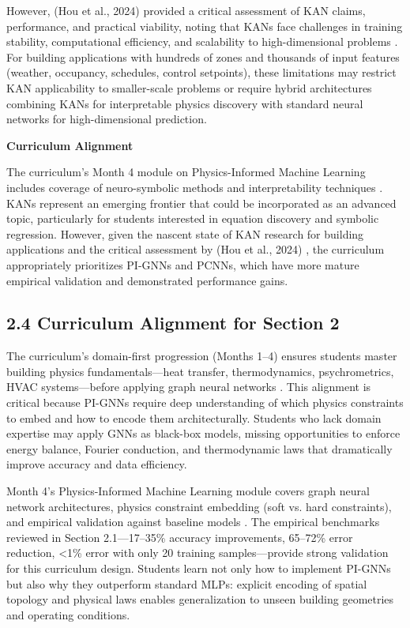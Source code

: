 \documentclass[12pt,a4paper]{article}
\begin{document}
However, (Hou et al., 2024) provided a critical assessment of KAN claims, performance, and practical viability, noting that KANs face challenges in training stability, computational efficiency, and scalability to high-dimensional problems \cite{ref44}. For building applications with hundreds of zones and thousands of input features (weather, occupancy, schedules, control setpoints), these limitations may restrict KAN applicability to smaller-scale problems or require hybrid architectures combining KANs for interpretable physics discovery with standard neural networks for high-dimensional prediction.

\textbf{Curriculum Alignment}

The curriculum's Month 4 module on Physics-Informed Machine Learning includes coverage of neuro-symbolic methods and interpretability techniques \cite{ref10}. KANs represent an emerging frontier that could be incorporated as an advanced topic, particularly for students interested in equation discovery and symbolic regression. However, given the nascent state of KAN research for building applications and the critical assessment by (Hou et al., 2024) \cite{ref44}, the curriculum appropriately prioritizes PI-GNNs and PCNNs, which have more mature empirical validation and demonstrated performance gains.

\subsection{2.4 Curriculum Alignment for Section 2}

The curriculum's domain-first progression (Months 1--4) ensures students master building physics fundamentals---heat transfer, thermodynamics, psychrometrics, HVAC systems---before applying graph neural networks \cite{ref10}. This alignment is critical because PI-GNNs require deep understanding of which physics constraints to embed and how to encode them architecturally. Students who lack domain expertise may apply GNNs as black-box models, missing opportunities to enforce energy balance, Fourier conduction, and thermodynamic laws that dramatically improve accuracy and data efficiency.

Month 4's Physics-Informed Machine Learning module covers graph neural network architectures, physics constraint embedding (soft vs. hard constraints), and empirical validation against baseline models \cite{ref10}. The empirical benchmarks reviewed in Section 2.1---17--35\% accuracy improvements, 65--72\% error reduction, <1\% error with only 20 training samples---provide strong validation for this curriculum design. Students learn not only how to implement PI-GNNs but also why they outperform standard MLPs: explicit encoding of spatial topology and physical laws enables generalization to unseen building geometries and operating conditions.
\end{document}
